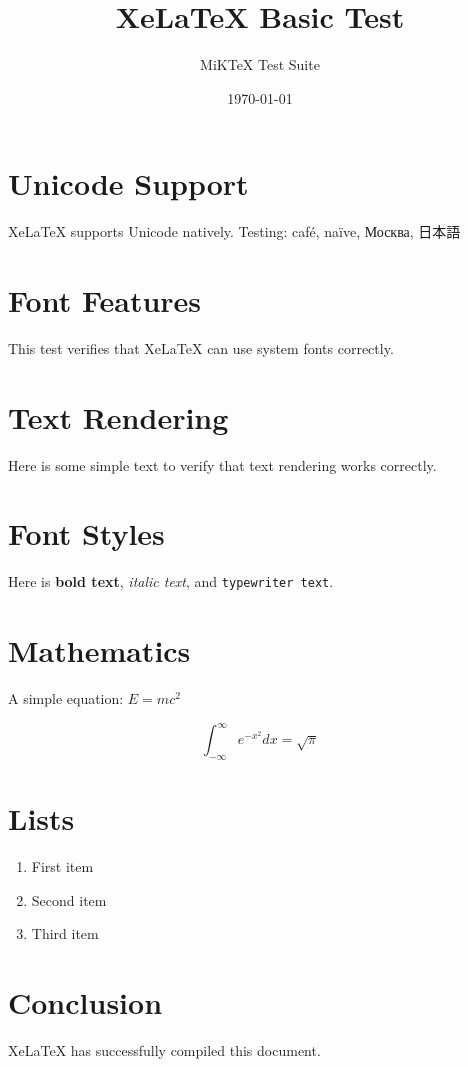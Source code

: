 \documentclass{article}
\title{XeLaTeX Basic Test}
\author{MiKTeX Test Suite}
\date{\today}
\begin{document}
\maketitle

\section{Unicode Support}
XeLaTeX supports Unicode natively. Testing: café, naïve, Москва, 日本語

\section{Font Features}
This test verifies that XeLaTeX can use system fonts correctly.

\section{Text Rendering}
Here is some simple text to verify that text rendering works correctly.

\section{Font Styles}
Here is \textbf{bold text}, \textit{italic text}, and \texttt{typewriter text}.

\section{Mathematics}
A simple equation: $E = mc^2$

\[
\int_{-\infty}^{\infty} e^{-x^2} dx = \sqrt{\pi}
\]

\section{Lists}
\begin{enumerate}
  \item First item
  \item Second item
  \item Third item
\end{enumerate}

\section{Conclusion}
XeLaTeX has successfully compiled this document.
\end{document}
